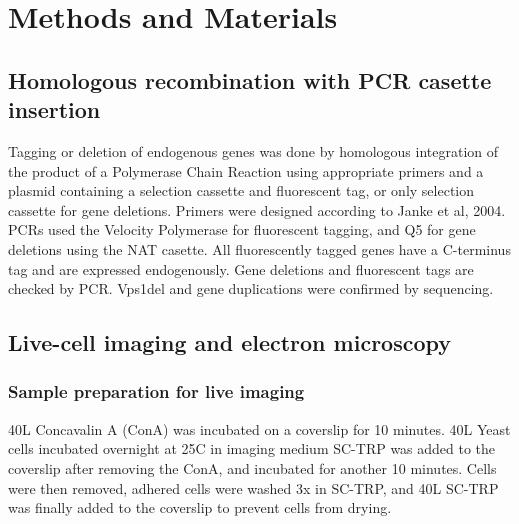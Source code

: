 \documentclass[9pt,lineno]{elife}
\begin{document}




\section{Methods and Materials}

\subsection{Homologous recombination with PCR casette insertion}
Tagging or deletion of endogenous genes was done by homologous integration of the product of a Polymerase Chain Reaction using appropriate primers and a plasmid containing a selection cassette and fluorescent tag, or only selection cassette for gene deletions. Primers were designed according to Janke et al, 2004. PCRs used the Velocity Polymerase for fluorescent tagging, and Q5 for gene deletions using the NAT casette. All fluorescently tagged genes have a C-terminus tag and are expressed endogenously. Gene deletions and fluorescent tags are checked by PCR. Vps1del and gene duplications were confirmed by sequencing.


\subsection{Live-cell imaging and electron microscopy}
\subsubsection{Sample preparation for live imaging}
40{\textmu}L Concavalin A (ConA) was incubated on a coverslip for 10 minutes. 40{\textmu}L Yeast cells incubated overnight at 25C in imaging medium SC-TRP was added to the coverslip after removing the ConA, and incubated for another 10 minutes. Cells were then removed, adhered cells were washed 3x in SC-TRP, and 40{\textmu}L SC-TRP was finally added to the coverslip to prevent cells from drying.
\end{document}
